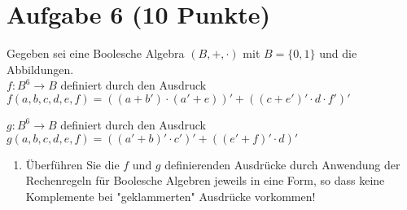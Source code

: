 \section*{Aufgabe 6 (10 Punkte)}

Gegeben sei eine Boolesche Algebra $(B, +, \cdot)$ mit $B = \{0, 1\}$ und die Abbildungen.\\

$f: B^6 \rightarrow B$ definiert durch den Ausdruck $f(a, b, c, d, e, f) = ((a + b') \cdot (a' + e))' + ((c + e')' \cdot d \cdot f')'$

$g: B^6 \rightarrow B$ definiert durch den Ausdruck $g(a, b, c, d, e, f) = ((a' + b)' \cdot c')' + ((e' + f)' \cdot d)'$

\begin{enumerate}[label={a)}, leftmargin=*]
\item Überführen Sie die $f$ und $g$ definierenden Ausdrücke durch Anwendung der Rechenregeln für Boolesche Algebren jeweils in eine Form, so dass keine Komplemente bei "geklammerten" Ausdrücke vorkommen!
\end{enumerate}